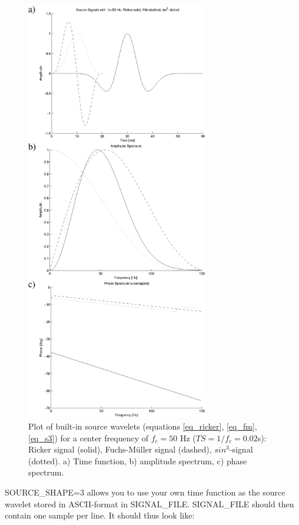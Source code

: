 \begin{figure}
\begin{center}
\includegraphics[width=8cm,angle=0]{figures/signals.eps}
\end{center}
\caption{Plot of built-in source wavelets (equations \ref{eq_ricker}, \ref{eq_fm}, \ref{eq_s3}) for a center frequency of $f_c=50$ Hz 
($TS=1/f_c=0.02$s): Ricker signal (solid), Fuchs-M\"uller signal (dashed), $sin^3$-signal (dotted). a) Time function, b) amplitude
spectrum, c) phase spectrum.  }
\label{fig_source_wavelets_json}
\end{figure}

\newpage

SOURCE\_SHAPE=3 allows you to use your own time function as the source wavelet stored in ASCII-format in SIGNAL\_FILE. SIGNAL\_FILE should then contain one sample per line. It should thus look like:

{\color{blue}{\begin{verbatim}
0.0
0.01
0.03
...
\end{verbatim}}}

